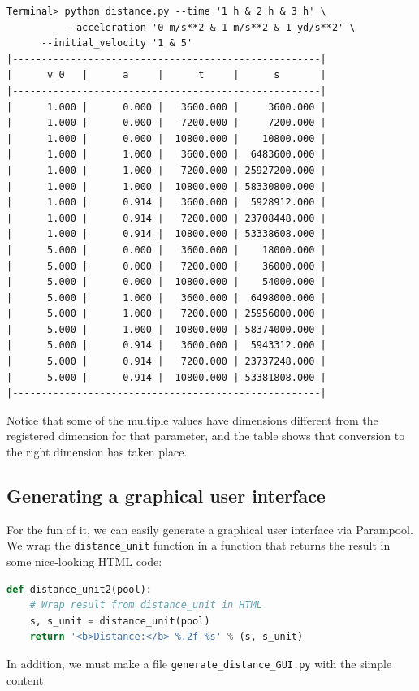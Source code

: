 \documentclass[graybox,envcountchap,sectrefs,final]{svmonodo}
\begin{document}
\begin{Verbatim}[frame=lines,label=\fbox{{\tiny Terminal}},framesep=2.5mm,framerule=0.7pt,fontsize=\fontsize{9pt}{9pt}]
Terminal> python distance.py --time '1 h & 2 h & 3 h' \ 
          --acceleration '0 m/s**2 & 1 m/s**2 & 1 yd/s**2' \ 
	  --initial_velocity '1 & 5'
|-----------------------------------------------------|
|      v_0   |      a     |      t     |      s       |
|-----------------------------------------------------|
|      1.000 |      0.000 |   3600.000 |     3600.000 |
|      1.000 |      0.000 |   7200.000 |     7200.000 |
|      1.000 |      0.000 |  10800.000 |    10800.000 |
|      1.000 |      1.000 |   3600.000 |  6483600.000 |
|      1.000 |      1.000 |   7200.000 | 25927200.000 |
|      1.000 |      1.000 |  10800.000 | 58330800.000 |
|      1.000 |      0.914 |   3600.000 |  5928912.000 |
|      1.000 |      0.914 |   7200.000 | 23708448.000 |
|      1.000 |      0.914 |  10800.000 | 53338608.000 |
|      5.000 |      0.000 |   3600.000 |    18000.000 |
|      5.000 |      0.000 |   7200.000 |    36000.000 |
|      5.000 |      0.000 |  10800.000 |    54000.000 |
|      5.000 |      1.000 |   3600.000 |  6498000.000 |
|      5.000 |      1.000 |   7200.000 | 25956000.000 |
|      5.000 |      1.000 |  10800.000 | 58374000.000 |
|      5.000 |      0.914 |   3600.000 |  5943312.000 |
|      5.000 |      0.914 |   7200.000 | 23737248.000 |
|      5.000 |      0.914 |  10800.000 | 53381808.000 |
|-----------------------------------------------------|

\end{Verbatim}
Notice that some of the multiple values have dimensions different
from the registered dimension for that parameter, and the table
shows that conversion to the right dimension has taken place.


\subsection{Generating a graphical user interface}

For the fun of it, we can easily generate a graphical user interface
via Parampool. We wrap the \Verb!distance_unit! function in a function that
returns the result in some nice-looking HTML code:

\begin{lstlisting}[language=Python,style=graycolor]
def distance_unit2(pool):
    # Wrap result from distance_unit in HTML
    s, s_unit = distance_unit(pool)
    return '<b>Distance:</b> %.2f %s' % (s, s_unit)
\end{lstlisting}
In addition, we must make a file \Verb!generate_distance_GUI.py! with the
simple content
\end{document}
